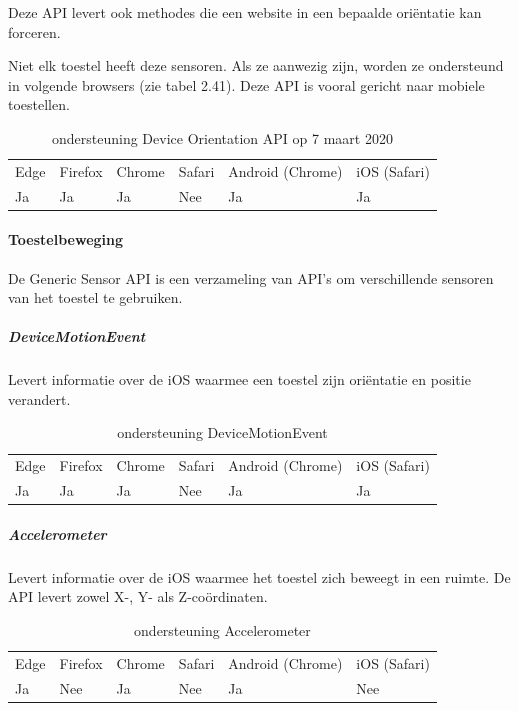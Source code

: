 	Deze API levert ook methodes die een website in een bepaalde oriëntatie kan forceren.
	
	Niet elk toestel heeft deze sensoren. Als ze aanwezig zijn, worden ze ondersteund in volgende browsers (zie tabel 2.41). Deze API is vooral gericht naar mobiele toestellen. 
	
	\begin{table}[H]
		\centering
		\begin{tabular}{llllll}
			Edge & Firefox & Chrome & Safari & Android (Chrome) & iOS (Safari) \\
			Ja   & Ja      &  Ja   & Nee     & Ja               & Ja          
		\end{tabular}
		\label{table:DeviceOrientation}	
		\caption{ondersteuning Device Orientation API op 7 maart 2020}
	\end{table}
	
	\paragraph{Toestelbeweging}
	De Generic Sensor API \autocite{Waldroon2019} is een verzameling van API's om verschillende sensoren van het toestel te gebruiken.
	
		\subparagraph{DeviceMotionEvent }
		Levert informatie over de iOS waarmee een toestel zijn oriëntatie en positie verandert.
		
		\begin{table}[H]
			\centering
			\begin{tabular}{llllll}
				Edge & Firefox & Chrome & Safari & Android (Chrome) & iOS (Safari) \\
				Ja   & Ja      &  Ja   & Nee     & Ja               & Ja          
			\end{tabular}	
			\caption{ondersteuning	DeviceMotionEvent  }
		\end{table} 
		
		
		\subparagraph{Accelerometer  }
			Levert informatie over de iOS waarmee het toestel zich beweegt in een ruimte. De API levert zowel X-, Y- als Z-coördinaten.
			
			\begin{table}[H]
				\centering
				\begin{tabular}{llllll}
					Edge & Firefox & Chrome & Safari & Android (Chrome) & iOS (Safari) \\
					Ja   & Nee      &  Ja   & Nee     & Ja               & Nee          
				\end{tabular}	
				\caption{ondersteuning	Accelerometer   }
			\end{table}
			

